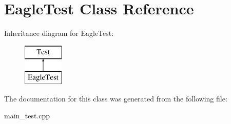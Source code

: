 \hypertarget{class_eagle_test}{}\section{Eagle\+Test Class Reference}
\label{class_eagle_test}
Inheritance diagram for Eagle\+Test\+:\begin{figure}[H]
\begin{center}
\leavevmode
\includegraphics[height=2.000000cm]{class_eagle_test}
\end{center}
\end{figure}


The documentation for this class was generated from the following file\+:\begin{DoxyCompactItemize}
\item 
main\+\_\+test.\+cpp\end{DoxyCompactItemize}
